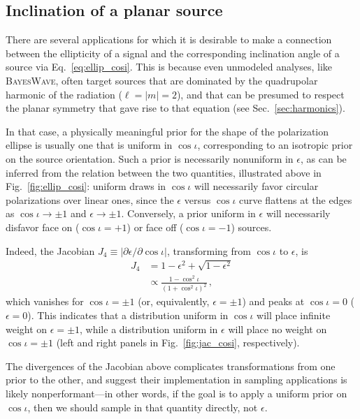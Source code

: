\documentclass[aps,prd,twocolumn,superscriptaddress,preprintnumbers,floatfix,nofootinbib]{revtex4-2}
\newcommand*{\eq}[1]{Eq.~\eqref{eq:#1}}
\begin{document}
\subsection{Inclination of a planar source}
\label{sec:jac:cosi}

There are several applications for which it is desirable to make a connection between the ellipticity of a signal and the corresponding inclination angle of a source via \eq{ellip_cosi}.
This is because even unmodeled analyses, like \textsc{BayesWave}, often target sources that are dominated by the quadrupolar harmonic of the radiation ($\ell=|m|=2$), and that can be presumed to respect the planar symmetry that gave rise to that equation (see Sec.~\ref{sec:harmonics}).

In that case, a physically meaningful prior for the shape of the polarization ellipse is usually one that is uniform in $\cos\iota$, corresponding to an isotropic prior on the source orientation.
Such a prior is necessarily nonuniform in $\epsilon$, as can be inferred from the relation between the two quantities, illustrated above in Fig.~\ref{fig:ellip_cosi}: uniform draws in $\cos\iota$ will necessarily favor circular polarizations over linear ones, since the $\epsilon$ versus $\cos\iota$ curve flattens at the edges as $\cos\iota\to\pm 1$ and $\epsilon \to \pm 1$.
Conversely, a prior uniform in $\epsilon$ will necessarily disfavor face on ($\cos\iota=+1$) or face off ($\cos\iota=-1$) sources.

Indeed, the Jacobian $J_4 \equiv \left|\partial\epsilon/\partial \cos\iota\right|$, transforming from $\cos\iota$ to $\epsilon$, is
\begin{subequations} \label{eq:jac_eps_cosi}
\begin{align}
J_4 &=1 - \epsilon^2 + \sqrt{1-\epsilon^2} \\
&\propto \frac{1 - \cos^2\iota}{\left(1+\cos^2\iota\right)^2} \, ,
\end{align}
\end{subequations}
which vanishes for $\cos\iota = \pm 1$ (or, equivalently, $\epsilon = \pm 1$) and peaks at $\cos\iota = 0$ ($\epsilon= 0$).
This indicates that a distribution uniform in $\cos\iota$ will place infinite weight on $\epsilon = \pm 1$, while a distribution uniform in $\epsilon$ will place no weight on $\cos\iota = \pm 1$ (left and right panels in Fig.~\ref{fig:jac_cosi}, respectively).

The divergences of the Jacobian above complicates transformations from one prior to the other, and suggest their implementation in sampling applications is likely nonperformant---in other words, if the goal is to apply a uniform prior on $\cos\iota$, then we should sample in that quantity directly, not $\epsilon$.
\end{document}
